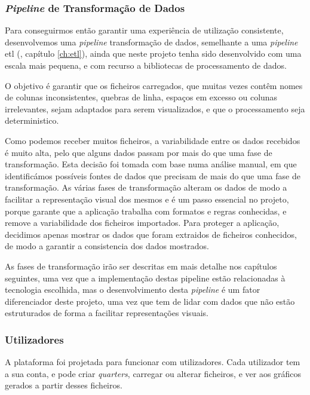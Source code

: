 \subsubsection{\textit{Pipeline} de Transformação de Dados}

Para conseguirmos então garantir uma experiência de utilização consistente, desenvolvemos uma \textit{pipeline} transformação de dados, semelhante a uma \textit{pipeline} \gls{etl} (\cf, capítulo \ref{ch:etl}), ainda que neste projeto tenha sido desenvolvido com uma escala mais pequena, e com recurso a bibliotecas de processamento de dados. 

O objetivo é garantir que os ficheiros carregados, que muitas vezes contêm nomes de colunas inconsistentes, quebras de linha, espaços em excesso ou colunas irrelevantes, sejam adaptados para serem visualizados, e que o processamento seja deterministico.

Como podemos receber muitos ficheiros, a variabilidade entre os dados recebidos é muito alta, pelo que alguns dados passam por mais do que uma fase de transformação. Esta decisão foi tomada com base numa análise manual, em que identificámos possíveis fontes de dados que precisam de mais do que uma fase de transformação. As várias fases de transformação alteram os dados de modo a facilitar a representação visual dos mesmos e é um passo essencial no projeto, porque garante que a aplicação trabalha com formatos e regras conhecidas, e remove a variabilidade dos ficheiros importados. Para proteger a aplicação, decidimos apenas mostrar os dados que foram extraidos de ficheiros conhecidos, de modo a garantir a consistencia dos dados mostrados.

As fases de transformação irão ser descritas em mais detalhe nos capítulos seguintes, uma vez que a implementação destas pipeline estão relacionadas à tecnologia escolhida, mas o desenvolvimento desta \textit{pipeline} é um fator diferenciador deste projeto, uma vez que tem de lidar com dados que não estão estruturados de forma a facilitar representações visuais. 

\subsubsection{Utilizadores}

A plataforma foi projetada para funcionar com utilizadores. Cada utilizador tem a sua conta, e pode criar \textit{quarters}, carregar ou alterar ficheiros, e ver aos gráficos gerados a partir desses ficheiros.

